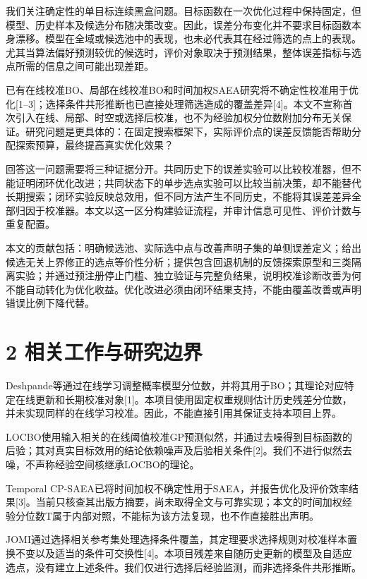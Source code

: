 \documentclass[11pt,a4paper]{article}
\begin{document}
我们关注确定性的单目标连续黑盒问题。目标函数在一次优化过程中保持固定，但模型、历史样本及候选分布随决策改变。因此，误差分布变化并不要求目标函数本身漂移。模型在全域或候选池中的表现，也未必代表其在经过筛选的点上的表现。尤其当算法偏好预测较优的候选时，评价对象取决于预测结果，整体误差指标与选点所需的信息之间可能出现差距。

已有在线校准BO、局部在线校准BO和时间加权SAEA研究将不确定性校准用于优化{[}1--3{]}；选择条件共形推断也已直接处理筛选造成的覆盖差异{[}4{]}。本文不宣称首次引入在线、局部、时空或选择后校准，也不为经验加权分位数附加分布无关保证。研究问题是更具体的：在固定搜索框架下，实际评价点的误差反馈能否帮助分配探索预算，最终提高真实优化效果？

回答这一问题需要将三种证据分开。共同历史下的误差实验可以比较校准器，但不能证明闭环优化改进；共同状态下的单步选点实验可以比较当前决策，却不能替代长期搜索；闭环实验反映总效用，但不同方法产生不同历史，不能将其误差差异全部归因于校准器。本文以这一区分构建验证流程，并审计信息可见性、评价计数与重复配置。

本文的贡献包括：明确候选池、实际选中点与改善声明子集的单侧误差定义；给出候选无关上界修正的选点等价性分析；提供包含回退机制的反馈探索原型和三类隔离实验；并通过预注册停止门槛、独立验证与完整负结果，说明校准诊断改善为何不能自动转化为优化收益。优化改进必须由闭环结果支持，不能由覆盖改善或声明错误比例下降代替。

\hypertarget{ux76f8ux5173ux5de5ux4f5cux4e0eux7814ux7a76ux8fb9ux754c}{%
\section{2
相关工作与研究边界}\label{ux76f8ux5173ux5de5ux4f5cux4e0eux7814ux7a76ux8fb9ux754c}}

Deshpande等通过在线学习调整概率模型分位数，并将其用于BO；其理论对应特定在线更新和长期校准对象{[}1{]}。本项目使用固定权重规则估计历史残差分位数，并未实现同样的在线学习校准。因此，不能直接引用其保证支持本项目上界。

LOCBO使用输入相关的在线阈值校准GP预测似然，并通过去噪得到目标函数的后验；其对真实目标效用的结论依赖噪声及后验相关条件{[}2{]}。我们不进行似然去噪，不声称经验空间核继承LOCBO的理论。

Temporal
CP-SAEA已将时间加权不确定性用于SAEA，并报告优化及评价效率结果{[}3{]}。当前只核查其出版方摘要，尚未取得全文与可靠实现；本文的时间加权经验分位数T属于内部对照，不能标为该方法复现，也不作直接胜出声明。

JOMI通过选择相关参考集处理选择条件覆盖，其定理要求选择规则对校准样本置换不变以及适当的条件可交换性{[}4{]}。本项目残差来自随历史更新的模型及自适应选点，没有建立上述条件。我们仅进行选择后经验监测，而非选择条件共形推断。
\end{document}

